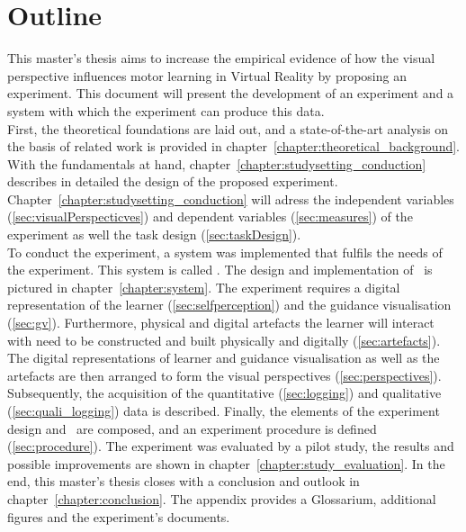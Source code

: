 \section{Outline}
This master's thesis aims to increase the empirical evidence of how the visual perspective influences motor learning in Virtual Reality by proposing an experiment. This document will present the development of an experiment and a system with which the experiment can produce this data.\\
First, the theoretical foundations are laid out, and a state-of-the-art analysis on the basis of related work is provided in chapter~\ref{chapter:theoretical_background}. With the fundamentals at hand, chapter~\ref{chapter:studysetting_conduction} describes in detailed the design of the proposed experiment. Chapter~\ref{chapter:studysetting_conduction} will adress the independent variables (\ref{sec:visualPerspecticves}) and dependent variables (\ref{sec:measures}) of the experiment as well the task design (\ref{sec:taskDesign}).\\
To conduct the experiment, a system was implemented that fulfils the needs of the experiment. This system is called \exgo. The design and implementation of \exgo\ is pictured in chapter~\ref{chapter:system}. The experiment requires a digital representation of the learner (\ref{sec:selfperception}) and the guidance visualisation (\ref{sec:gv}). Furthermore, physical and digital artefacts the learner will interact with need to be constructed and built physically and digitally (\ref{sec:artefacts}). The digital representations of learner and guidance visualisation as well as the artefacts are then arranged to form the visual perspectives (\ref{sec:perspectives}). Subsequently, the acquisition of the quantitative (\ref{sec:logging}) and qualitative (\ref{sec:quali_logging}) data is described. Finally, the elements of the experiment design and \exgo\ are composed, and an experiment procedure is defined (\ref{sec:procedure}). The experiment was evaluated by a pilot study, the results and possible improvements are shown in chapter~\ref{chapter:study_evaluation}. In the end, this master's thesis closes with a conclusion and outlook in chapter~\ref{chapter:conclusion}. The appendix provides a Glossarium, additional figures and the experiment's documents.



